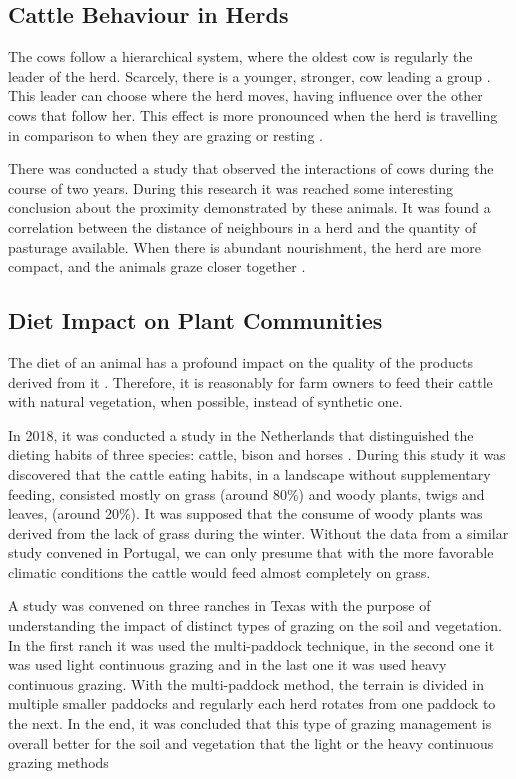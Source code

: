 \subsection{Cattle Behaviour in Herds}
\label{subsec:behaviour_herds}
The cows follow a hierarchical system, where the oldest cow is regularly the leader of the
herd. Scarcely, there is a younger, stronger, cow leading a group \cite{Harris2007}. This
leader can choose where the herd moves, having influence over the other cows that follow her.
This effect is more pronounced when the herd is travelling in comparison to when they are
grazing or resting \cite{Vsarova2010}.

There was conducted a study that observed the interactions of cows during the course of two
years. During this research it was reached some interesting conclusion about the proximity
demonstrated by these animals. It was found a correlation between the distance of neighbours
in a herd and the quantity of pasturage available. When there is abundant nourishment, the
herd are more compact, and the animals graze closer together \cite{Harris2007}.

\subsection{Diet Impact on Plant Communities}
\label{subsec:diet}
The diet of an animal has a profound impact on the quality of the products derived from it \cite{Araujo2014}.
Therefore, it is reasonably for farm owners to feed their cattle with natural vegetation, when
possible, instead of synthetic one.

In 2018, it was conducted a study in the Netherlands that distinguished the dieting habits of
three species: cattle, bison and horses \cite{Cromsigt2018}. During this study it was
discovered that the cattle eating habits, in a landscape without supplementary feeding,
consisted mostly on grass (around 80\%) and woody plants, twigs and leaves, (around 20\%). It
was supposed that the consume of woody plants was derived from the lack of grass during the
winter. Without the data from a similar study convened in Portugal, we can only presume that
with the more favorable climatic conditions the cattle would feed almost completely on grass.

A study was convened on three ranches in Texas with the purpose of understanding the impact
of distinct types of grazing on the soil and vegetation. In the first ranch it was used the
multi-paddock technique, in the second one it was used light continuous grazing and in the
last one it was used heavy continuous grazing. With the multi-paddock method, the terrain is
divided in multiple smaller paddocks and regularly each herd rotates from one paddock to the
next. In the end, it was concluded that this type of grazing management is overall better for
the soil and vegetation that the light or the heavy continuous grazing methods \cite{Teague2011}

